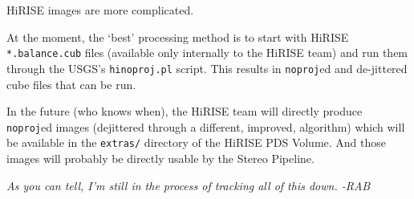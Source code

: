 HiRISE images are more complicated.

At the moment, the `best' processing method is to start with HiRISE
\texttt{*.balance.cub} files (available only internally to the
HiRISE team) and run them through the USGS's \texttt{hinoproj.pl}
script.  This results in \texttt{noproj}ed and de-jittered cube
files that can be run.

In the future (who knows when), the HiRISE team will directly produce
\texttt{noproj}ed images (dejittered through a different, improved,
algorithm) which will be available in the \texttt{extras/} directory
of the HiRISE PDS Volume.  And those images will probably be directly
usable by the Stereo Pipeline.

\emph{As you can tell, I'm still in the process of tracking all of this down. -RAB}
